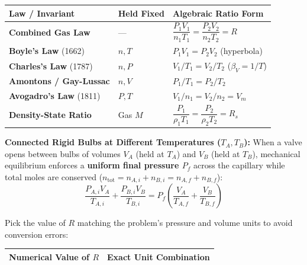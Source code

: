 \begin{twocol}[0.51]
\begin{formulacard}
\par\smallskip\noindent
\footnotesize
\begin{tabularx}{\linewidth}{@{}l l X@{}}
\toprule
\textbf{Law / Invariant} & \textbf{Held Fixed} & \textbf{Algebraic Ratio Form} \\
\midrule
\textbf{Combined Gas Law} & — & $\dfrac{P_1 V_1}{n_1 T_1} = \dfrac{P_2 V_2}{n_2 T_2} = R$ \\[5pt]
\textbf{Boyle's Law} (1662) & $n, T$ & $P_1 V_1 = P_2 V_2$ (hyperbola) \\[2pt]
\textbf{Charles's Law} (1787) & $n, P$ & $V_1/T_1 = V_2/T_2$ ($\beta_V = 1/T$) \\[2pt]
\textbf{Amontons / Gay-Lussac} & $n, V$ & $P_1/T_1 = P_2/T_2$ \\[2pt]
\textbf{Avogadro's Law} (1811) & $P, T$ & $V_1/n_1 = V_2/n_2 = V_m$ \\[2pt]
\textbf{Density-State Ratio} & Gas $M$ & $\dfrac{P_1}{\rho_1 T_1} = \dfrac{P_2}{\rho_2 T_2} = R_s$ \\
\bottomrule
\end{tabularx}
\par\smallskip\noindent
\textbf{Connected Rigid Bulbs at Different Temperatures ($T_A, T_B$):} When a valve opens between bulbs of volumes $V_A$ (held at $T_A$) and $V_B$ (held at $T_B$), mechanical equilibrium enforces a \textbf{uniform final pressure $P_f$} across the capillary while total moles are conserved ($n_{\mathrm{tot}} = n_{A,i} + n_{B,i} = n_{A,f} + n_{B,f}$):
\begin{equation}\label{eq:06:two-bulbs}
  \frac{P_{A,i}V_A}{T_{A,i}} + \frac{P_{B,i}V_B}{T_{B,i}} = P_f\left(\frac{V_A}{T_{A,f}} + \frac{V_B}{T_{B,f}}\right)
\end{equation}
\end{formulacard}
\nextcol[0.47]
\begin{shortcut}
Pick the value of $R$ matching the problem's pressure and volume units to avoid conversion errors:
\par\smallskip\noindent
\footnotesize
\begin{tabularx}{\linewidth}{@{}l X@{}}
\toprule
\textbf{Numerical Value of $R$} & \textbf{Exact Unit Combination} \\
\midrule

\end{tabularx}
\end{shortcut}
\end{twocol}

